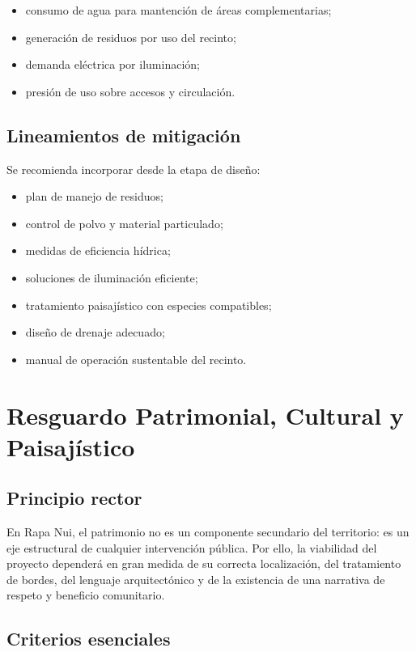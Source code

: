 \documentclass[12pt,letterpaper]{article}
\begin{document}
\begin{itemize}
    \item consumo de agua para mantención de áreas complementarias;
    \item generación de residuos por uso del recinto;
    \item demanda eléctrica por iluminación;
    \item presión de uso sobre accesos y circulación.
\end{itemize}

\subsection{Lineamientos de mitigación}

Se recomienda incorporar desde la etapa de diseño:

\begin{itemize}
    \item plan de manejo de residuos;
    \item control de polvo y material particulado;
    \item medidas de eficiencia hídrica;
    \item soluciones de iluminación eficiente;
    \item tratamiento paisajístico con especies compatibles;
    \item diseño de drenaje adecuado;
    \item manual de operación sustentable del recinto.
\end{itemize}

\section{Resguardo Patrimonial, Cultural y Paisajístico}

\subsection{Principio rector}

En Rapa Nui, el patrimonio no es un componente secundario del territorio: es un eje estructural de cualquier intervención pública. Por ello, la viabilidad del proyecto dependerá en gran medida de su correcta localización, del tratamiento de bordes, del lenguaje arquitectónico y de la existencia de una narrativa de respeto y beneficio comunitario.

\subsection{Criterios esenciales}
\end{document}
